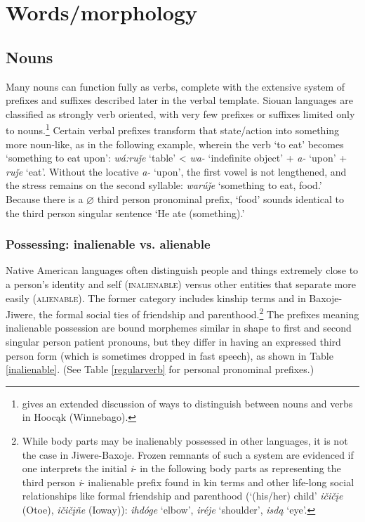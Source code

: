 \documentclass[output=paper]{LSP/langsci}
\begin{document}
\section{Words/morphology}
\subsection{Nouns}   Many nouns can function fully as verbs, complete with the extensive system of prefixes and suffixes described later in the verbal template. Siouan languages are classified as strongly verb oriented, with very few prefixes or suffixes limited only to nouns.\footnote{\citet{Helmbrecht2002} gives an extended discussion of ways to distinguish between nouns and verbs in Hooc\k{a}k (Winnebago).} Certain verbal prefixes transform that state/action into something more noun-like, as in the following example, wherein the verb `to eat' becomes `something to eat upon':  \textit{w\'a:ru\v{j}e} `table' < \textit{wa-} `indefinite object' + \textit{a-} `upon' + \textit{ru\v{j}e} `eat'. Without the locative \textit{a-} `upon', the first vowel is not lengthened, and the stress remains on the second syllable: \textit{war\'u\v{j}e} `something to eat, food.'  Because there is a $\varnothing$ third person pronominal prefix, `food' sounds identical to the third person singular sentence `He ate (something).'

\subsubsection{Possessing: inalienable vs. alienable}  Native American languages often distinguish people and things extremely close to a person's identity and self (\textsc{inalienable}) versus other entities that separate more easily (\textsc{alienable}). The former category includes kinship terms and in Baxoje-Jiwere, the formal social ties of friendship and parenthood.\footnote{While body parts may be inalienably possessed in other languages, it is not the case in Jiwere-Baxoje. Frozen remnants of such a system are evidenced if one interprets the initial \textit{i}- in the following body parts as representing the third person \textit{i}- inalienable prefix found in kin terms and other life-long social relationships like formal friendship and parenthood (`(his/her) child' \textit{i\v{c}i\v{c}\k{i}e} (Otoe), \textit{i\v{c}i\v{c}\k{i}\~ne} (Ioway)): \textit{ihd\'oge} `elbow', \textit{ir\'eje} `shoulder', \textit{isd\k{a}} `eye'.} The prefixes meaning inalienable possession are bound morphemes similar in shape to first and second singular person patient  pronouns, but they differ in having an expressed third person form (which is sometimes dropped in fast speech), as shown in Table \ref{inalienable}. (See Table \ref{regularverb} for personal pronominal prefixes.)
\end{document}
